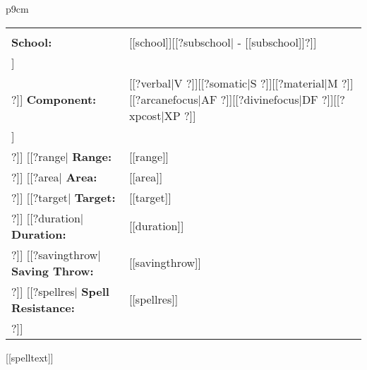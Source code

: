 \noindent



\begin{supertabular}{p{9cm}}
  \begin{center}
  \begin{tabular}{>{\raggedleft}p{4cm}>{\raggedright}p{4cm}}
    \multicolumn{1}{>{\raggedright}p{4cm}}{
      \scshape\footnotesize{[[book]]}
    } &
    \multicolumn{1}{>{\raggedleft}p{4cm}}{
      \scshape\footnotesize{[[d20class]] [[level]]}
    }\tabularnewline
    \rule{0pt}{4ex}
    \textbf{School:} & [[school]][[?subschool| - [[subschool]]?]] \tabularnewline
[[?descriptor|    \textbf{Descriptors:} & [[descriptor]] \tabularnewline?]]
    \textbf{Component:} &  [[?verbal|V ?]][[?somatic|S ?]][[?material|M ?]][[?arcanefocus|AF ?]][[?divinefocus|DF ?]][[?xpcost|XP ?]] \tabularnewline
[[?castingtime|    \textbf{Casting Time:} & [[castingtime]] \tabularnewline?]]
[[?range|    \textbf{Range:} & {[[range]]} \tabularnewline?]]
[[?area|    \textbf{Area:} & [[area]] \tabularnewline?]]
[[?target|    \textbf{Target:} & [[target]] \tabularnewline?]]
[[?duration|    \textbf{Duration:} & {[[duration]]} \tabularnewline?]]
[[?savingthrow|    \textbf{Saving Throw:} & [[savingthrow]] \tabularnewline?]]
[[?spellres|    \textbf{Spell Resistance:} & [[spellres]] \tabularnewline?]]
  \multicolumn{2}{c}{
    \pgfornament[width=3cm]{87}
   }\tabularnewline
  \end{tabular}
  \end{center}
[[spelltext]]\\
\rule{0pt}{4ex} \\
\end{supertabular} 
